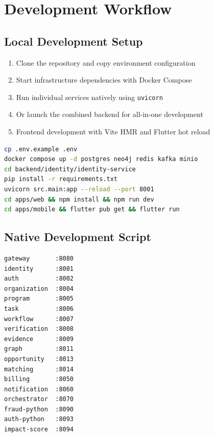 \clearpage

\section{Development Workflow}

\subsection{Local Development Setup}

\begin{enumerate}
  \item Clone the repository and copy environment configuration
  \item Start infrastructure dependencies with Docker Compose
  \item Run individual services natively using \texttt{uvicorn}
  \item Or launch the combined backend for all-in-one development
  \item Frontend development with Vite HMR and Flutter hot reload
\end{enumerate}

\begin{lstlisting}[language=bash, caption=Development Setup Commands]
cp .env.example .env
docker compose up -d postgres neo4j redis kafka minio
cd backend/identity/identity-service
pip install -r requirements.txt
uvicorn src.main:app --reload --port 8001
cd apps/web && npm install && npm run dev
cd apps/mobile && flutter pub get && flutter run
\end{lstlisting}

\subsection{Native Development Script}

\begin{lstlisting}[language=bash, caption=Native Port Assignments]
gateway       :8080
identity      :8001
auth          :8002
organization  :8004
program       :8005
task          :8006
workflow      :8007
verification  :8008
evidence      :8009
graph         :8011
opportunity   :8013
matching      :8014
billing       :8050
notification  :8060
orchestrator  :8070
fraud-python  :8090
auth-python   :8093
impact-score  :8094
\end{lstlisting}

